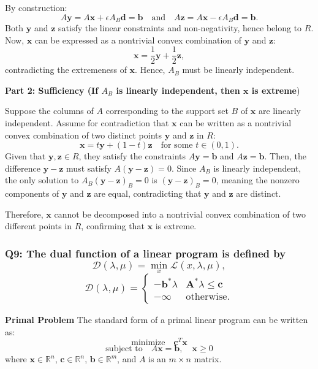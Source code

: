 \documentclass[8pt]{article}
\begin{document}
{By construction:
\[
A\mathbf{y} = A\mathbf{x} + \epsilon A_B \mathbf{d} = \mathbf{b} \quad \text{and} \quad A\mathbf{z} = A\mathbf{x} - \epsilon A_B \mathbf{d} = \mathbf{b}.
\]
Both \(\mathbf{y}\) and \(\mathbf{z}\) satisfy the linear constraints and non-negativity, hence belong to \(R\). Now, \(\mathbf{x}\) can be expressed as a nontrivial convex combination of \(\mathbf{y}\) and \(\mathbf{z}\):
\[
\mathbf{x} = \frac{1}{2}\mathbf{y} + \frac{1}{2}\mathbf{z},
\]
contradicting the extremeness of \(\mathbf{x}\). Hence, \(A_B\) must be linearly independent.

\textbf{Part 2: Sufficiency (If \(A_B\) is linearly independent, then \(\mathbf{x}\) is extreme})

Suppose the columns of \(A\) corresponding to the support set \(B\) of \(\mathbf{x}\) are linearly independent. Assume for contradiction that \(\mathbf{x}\) can be written as a nontrivial convex combination of two distinct points \(\mathbf{y}\) and \(\mathbf{z}\) in \(R\):
\[
\mathbf{x} = t\mathbf{y} + (1 - t)\mathbf{z} \quad \text{for some } t \in (0,1).
\]
Given that \(\mathbf{y}, \mathbf{z} \in R\), they satisfy the constraints \(A\mathbf{y} = \mathbf{b}\) and \(A\mathbf{z} = \mathbf{b}\). Then, the difference \(\mathbf{y} - \mathbf{z}\) must satisfy \(A(\mathbf{y} - \mathbf{z}) = 0\). Since \(A_B\) is linearly independent, the only solution to \(A_B(\mathbf{y} - \mathbf{z})_B = 0\) is \((\mathbf{y} - \mathbf{z})_B = 0\), meaning the nonzero components of \(\mathbf{y}\) and \(\mathbf{z}\) are equal, contradicting that \(\mathbf{y}\) and \(\mathbf{z}\) are distinct.

Therefore, \(\mathbf{x}\) cannot be decomposed into a nontrivial convex combination of two different points in \(R\), confirming that \(\mathbf{x}\) is extreme.

\subsubsection*{Q9: The dual function of a linear program is defined by
\[ \mathcal{D}(\lambda, \mu) = \min_x \mathcal{L}(x, \lambda, \mu), \]
\[ \mathcal{D}(\lambda, \mu) = \begin{cases} 
-\mathbf{b}^* \lambda & \mathbf{A}^* \lambda \leq \mathbf{c} \\
-\infty & \text{otherwise}.
\end{cases} \]}

\textbf{Primal Problem}
The standard form of a primal linear program can be written as:
\[
\text{minimize} \quad \mathbf{c}^T \mathbf{x}
\]
\[
\text{subject to} \quad A\mathbf{x} = \mathbf{b}, \quad \mathbf{x} \geq 0
\]
where \( \mathbf{x} \in \mathbb{R}^n \), \( \mathbf{c} \in \mathbb{R}^n \), \( \mathbf{b} \in \mathbb{R}^m \), and \( A \) is an \( m \times n \) matrix.

}
\end{document}
